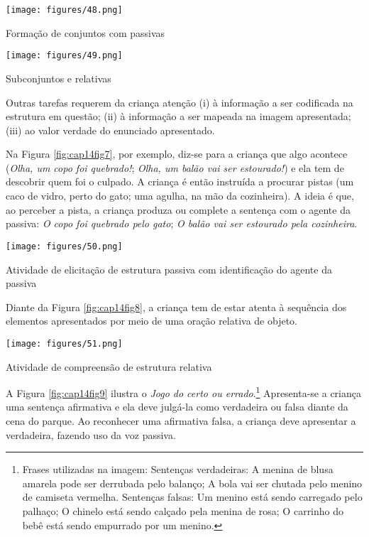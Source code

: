 \documentclass[output=paper,colorlinks,citecolor=brown,booklanguage=portuguese]{langscibook}
\begin{document}
\begin{Figura}
\texttt{[image: figures/48.png]}
 \caption{Formação de conjuntos com passivas}
 \label{fig:cap14fig5}
 \end{Figura}
 
 \begin{Figura}
   \texttt{[image: figures/49.png]}
\caption{Subconjuntos e relativas}
\label{fig:cap14fig6}  
 \end{Figura}



Outras tarefas requerem da criança atenção (i) à informação a ser codificada na estrutura em questão; (ii) à informação a ser mapeada na imagem apresentada; (iii) ao valor verdade do enunciado apresentado.

Na Figura \ref{fig:cap14fig7}, por exemplo, diz-se para a criança que algo acontece (\emph{Olha, um copo foi quebrado!}; \emph{Olha, um balão vai ser estourado!}) e ela tem de descobrir quem foi o culpado. A criança é então instruída a procurar pistas (um caco de vidro, perto do gato; uma agulha, na mão da cozinheira). A ideia é que, ao perceber a pista, a criança produza ou complete a sentença com o agente da passiva: \emph{O copo foi quebrado pelo gato}; \emph{O balão vai ser estourado pela cozinheira}. 



\begin{Figura}
    \texttt{[image: figures/50.png]}
    \caption{{Atividade de elicitação de estrutura passiva com identificação do agente da passiva}}
    \label{fig:cap14fig7}
\end{Figura}



Diante da Figura \ref{fig:cap14fig8}, a criança tem de estar atenta à sequência dos elementos apresentados por meio de uma oração relativa de objeto. 

\begin{Figura}
    \texttt{[image: figures/51.png]}
    \caption{{Atividade de compreensão de estrutura relativa}}
    \label{fig:cap14fig8}
\end{Figura}



\newpage
A Figura \ref{fig:cap14fig9} ilustra o \emph{Jogo do certo ou errado}.\footnote{Frases utilizadas na imagem: Sentenças verdadeiras: A menina de blusa amarela pode ser derrubada pelo balanço; A bola vai ser chutada pelo menino de camiseta vermelha. Sentenças falsas: Um menino está sendo carregado pelo palhaço; O chinelo está sendo calçado pela menina de rosa; O carrinho do bebê está sendo empurrado por um menino.} Apresenta-se a criança uma sentença afirmativa e ela deve julgá-la como verdadeira ou falsa diante da cena do parque. Ao reconhecer uma afirmativa falsa, a criança deve apresentar a verdadeira, fazendo uso da voz passiva.
\end{document}
